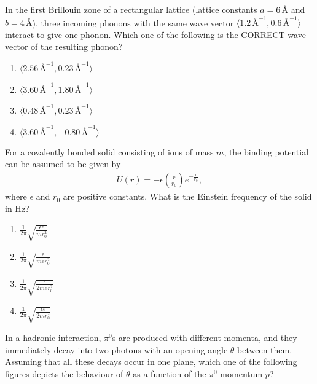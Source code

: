 \item In the first Brillouin zone of a rectangular lattice (lattice constants $a = 6 \, \text{Å}$ and $b = 4 \, \text{Å}$), three incoming phonons with the same wave vector $\langle 1.2 \, \text{Å}^{-1}, 0.6 \, \text{Å}^{-1} \rangle$ interact to give one phonon. Which one of the following is the CORRECT wave vector of the resulting phonon?
\begin{enumerate}
\item $\langle 2.56 \, \text{Å}^{-1}, 0.23 \, \text{Å}^{-1} \rangle$
\item $\langle 3.60 \, \text{Å}^{-1}, 1.80 \, \text{Å}^{-1} \rangle $
\item $\langle 0.48 \, \text{Å}^{-1}, 0.23 \, \text{Å}^{-1} \rangle$
\item $\langle 3.60 \, \text{Å}^{-1}, -0.80 \, \text{Å}^{-1} \rangle$
\end{enumerate}
\item For a covalently bonded solid consisting of ions of mass $m$, the binding potential can be assumed to be given by 
\begin{align*}
	U(r) = -\epsilon \left ( \frac{r}{r_0} \right)e^{-\frac{r}{r_0}},
\end{align*}
where $\epsilon$ and $r_0$ are positive constants. What is the Einstein frequency of the solid in Hz?
\begin{enumerate}
\item $\frac{1}{2\pi} \sqrt{\frac{\epsilon e}{m r_0^2}}$
\item $\frac{1}{2\pi} \sqrt{\frac{\epsilon }{me r_0^2}}$
\item $\frac{1}{2\pi} \sqrt{\frac{\epsilon }{2me r_0^2}}$
\item $\frac{1}{2\pi} \sqrt{\frac{\epsilon e}{2m r_0^2}}$
\end{enumerate}
\item In a hadronic interaction, $\pi^0$s are produced with different momenta, and they immediately decay into two photons with an opening angle $\theta$ between them. Assuming that all these decays occur in one plane, which one of the following figures depicts the behaviour of $\theta$ as a function of the $\pi^0$ momentum $p$?
